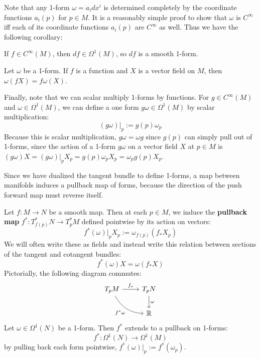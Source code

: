 Note that any 1-form $\omega = a_i dx^i$ is determined completely by the coordinate functions $a_i(p)$ for $p\in M$. It is 
a reasonably simple proof to show that $\omega$ is $C^\infty$ iff each of its coordinate functions $a_i(p)$ are $C^\infty$ as 
well. Thus we have the following corollary:
\begin{corollary}
	If $f\in C^\infty(M)$, then $df\in\Omega^1(M)$, so $df$ is a smooth 1-form. 
\end{corollary}
\begin{lemma}
	Let $\omega$ be a 1-form. If $f$ is a function and $X$ is a vector field on $M$, then $\omega(fX) = f\omega(X)$. 
\end{lemma}
Finally, note that we can scalar multiply 1-forms by functions. For $g\in C^\infty(M)$ and $\omega\in\Omega^1(M)$, we can 
define a one form $g\omega\in\Omega^1(M)$ by scalar multiplication:
\begin{equation}
	(g\omega)|_p := g(p)\omega_p
\end{equation}
Because this is scalar multiplication, $g\omega = \omega g$ since $g(p)$ can simply pull out of 1-forms, since the 
action of a 1-form $g\omega$ on a vector field $X$ at $p\in M$ is $(g\omega) X = (g\omega)|_p X_p = g(p)\omega_p X_p
= \omega_p g(p) X_p$. 

Since we have dualized the tangent bundle to define 1-forms, a map between manifolds induces a pullback map 
of forms, because the direction of the push forward map must reverse itself. 
\begin{definition}[Pullback]
Let $f : M\rightarrow N$ be a smooth map. Then at each $p\in M$, we induce the \textbf{pullback map} $f^* : T_{f(p)}^* N 
\rightarrow T_p^* M$ defined pointwise by its action on vectors:
\begin{equation}
	f^*(\omega)|_p X_p := \omega_{f(p)}(f_* X_p)
\end{equation}
We will often write these as fields and instead write this relation between sections of the tangent and cotangent bundles:
\begin{equation}
	f^*(\omega) X = \omega(f_* X)
\end{equation}
Pictorially, the following diagram commutes:
\begin{equation}\begin{tikzcd}
	T_p M\arrow[r, "f_*"] \arrow[dr, bend right, "f^*\omega"'] & T_p N \arrow[d, "\omega"] \\
	& \mathbb R
\end{tikzcd}\end{equation}
Let $\omega\in\Omega^1(N)$ be a 1-form. Then $f^*$ extends to a pullback on 1-forms:
\begin{equation}
	f^* : \Omega^1(N) \rightarrow\Omega^1(M)
\end{equation}
by pulling back each form pointwise, $f^*(\omega)|_p := f^*(\omega_p)$. 
\end{definition}

